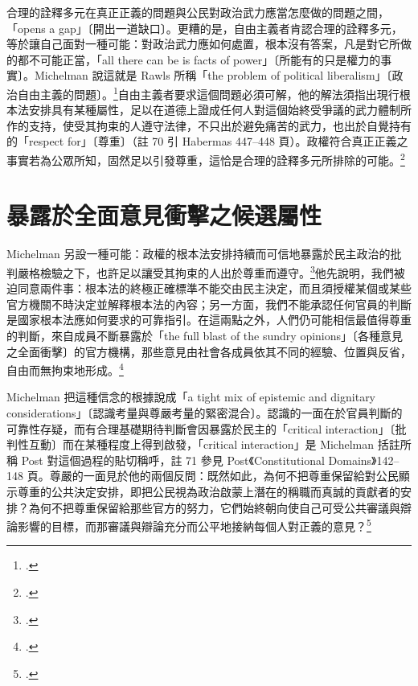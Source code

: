 合理的詮釋多元在真正正義的問題與公民對政治武力應當怎麼做的問題之間，「opens a gap」〔開出一道缺口〕。更糟的是，自由主義者肯認合理的詮釋多元，等於讓自己面對一種可能：對政治武力應如何處置，根本沒有答案，凡是對它所做的都不可能正當，「all there can be is facts of power」〔所能有的只是權力的事實〕。Michelman 說這就是 Rawls 所稱「the problem of political liberalism」〔政治自由主義的問題〕。\footcite[422 \& n.69]{michelman1998}自由主義者要求這個問題必須可解，他的解法須指出現行根本法安排具有某種屬性，足以在道德上證成任何人對這個始終受爭議的武力體制所作的支持，使受其拘束的人遵守法律，不只出於避免痛苦的武力，也出於自覺持有的「respect for」〔尊重〕（註 70 引 Habermas 447--448 頁）。政權符合真正正義之事實若為公眾所知，固然足以引發尊重，這恰是合理的詮釋多元所排除的可能。\footcite[422 \& n.70]{michelman1998}

\section{暴露於全面意見衝擊之候選屬性}
\label{sec:40_paradox-4}

Michelman 另設一種可能：政權的根本法安排持續而可信地暴露於民主政治的批判嚴格檢驗之下，也許足以讓受其拘束的人出於尊重而遵守。\footcite[423]{michelman1998}他先說明，我們被迫同意兩件事：根本法的終極正確標準不能交由民主決定，而且須授權某個或某些官方機關不時決定並解釋根本法的內容；另一方面，我們不能承認任何官員的判斷是國家根本法應如何要求的可靠指引。在這兩點之外，人們仍可能相信最值得尊重的判斷，來自成員不斷暴露於「the full blast of the sundry opinions」〔各種意見之全面衝擊〕的官方機構，那些意見由社會各成員依其不同的經驗、位置與反省，自由而無拘束地形成。\footcite[423]{michelman1998}

Michelman 把這種信念的根據說成「a tight mix of epistemic and dignitary considerations」〔認識考量與尊嚴考量的緊密混合〕。認識的一面在於官員判斷的可靠性存疑，而有合理基礎期待判斷會因暴露於民主的「critical interaction」〔批判性互動〕而在某種程度上得到啟發，「critical interaction」是 Michelman 括註所稱 Post 對這個過程的貼切稱呼，註 71 參見 Post《Constitutional Domains》142--148 頁。尊嚴的一面見於他的兩個反問：既然如此，為何不把尊重保留給對公民顯示尊重的公共決定安排，即把公民視為政治啟蒙上潛在的稱職而真誠的貢獻者的安排？為何不把尊重保留給那些官方的努力，它們始終朝向使自己可受公共審議與辯論影響的目標，而那審議與辯論充分而公平地接納每個人對正義的意見？\footcite[423 \& n.71]{michelman1998}

